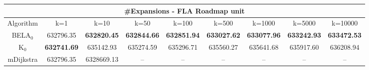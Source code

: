 \begin{tabular}{c|cccccccc}\toprule
\multicolumn{9}{c}{#Expansions - FLA Roadmap unit}\\ \midrule
Algorithm & k=1 & k=10 & k=50 & k=100 & k=500 & k=1000 & k=5000 & k=10000 \\ \midrule
BELA$_0$ & 632796.35 & \textbf{632820.45} & \textbf{632844.66} & \textbf{632851.94} & \textbf{633027.62} & \textbf{633077.96} & \textbf{633242.93} & \textbf{633472.53} \\
K$_0$ & \textbf{632741.69} & 635142.93 & 635274.59 & 635296.71 & 635560.27 & 635641.68 & 635917.60 & 636208.94 \\
mDijkstra & 632796.35 & 6328669.13 & -- & -- & -- & -- & -- & -- \\ \bottomrule 
\end{tabular}

